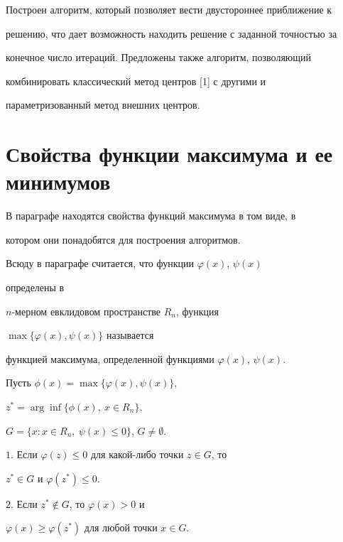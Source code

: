 Построен алгоритм, который позволяет вести двустороннее приближение к 


решению, что дает возможность находить решение с заданной точностью за 


конечное число итераций. Предложены также алгоритм, позволяющий 


комбинировать классический метод центров [1] с другими и 


параметризованный метод внешних центров. 


 


\section{Свойства функции максимума и ее минимумов} 


 


В параграфе находятся свойства функций максимума в том виде, в 


котором они понадобятся для построения алгоритмов. 


Всюду в параграфе считается, что функции $\varphi(x)$, $\psi(x)$ 


определены в 


$n$-мерном евклидовом пространстве $R_n$, функция 


$\max\{\varphi(x),\psi(x)\}$ называется 


функцией максимума, определенной функциями $\varphi(x)$, $\psi(x)$. 


 


\begin{lem} Пусть $\phi(x)=\max\{\varphi(x),\psi(x)\}$, 


$z^*=\arg\inf\{\phi(x),\ x\in R_n\}$, 


$G=\{x:x\in R_n,\ \psi(x)\le 0\}$, $G\ne \emptyset$. 


 


$1.$ Если $\varphi(z)\le 0$ для какой-либо точки $z\in G$, то 


$z^*\in G$ и $\varphi(z^*)\le 0$. 


 


$2.$ Если $z^*\notin G$, то $\varphi(x)>0$ и 


$\varphi(x)\ge\varphi(z^*)$ для любой точки $x\in G$. 


\end{lem} 


